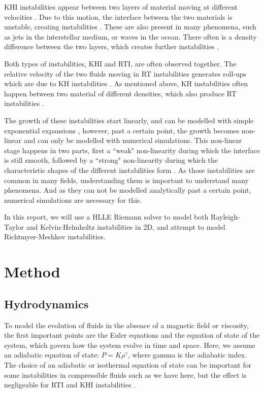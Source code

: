 \documentclass[a4paper,12pt]{article}
\begin{document}
KHI instabilities appear between two layers of material moving at different velocities \parencite{zhou_rayleightaylor_2021}. Due to this motion, the interface between the two materials is unstable, creating instabilities \parencite{matsumoto_onset_2004}. These are also present in many phenomena, such as jets in the interstellar medium, or waves in the ocean. There often is a density difference between the two layers, which creates further instabilities \parencite{matsumoto_onset_2004}.

Both types of instabilities, KHI and RTI, are often observed together. The relative velocity of the two fluids moving in RT instabilities generates roll-ups which are due to KH instabilities \parencite{zhou_rayleightaylor_2021}. As mentioned above, KH instabilities often happen between two material of different densities, which also produce RT instabilities \parencite{matsumoto_onset_2004}.\\
\linebreak

The growth of these instabilities start linearly, and can be modelled with simple exponential expansions \parencite{zhou_rayleightaylor_2021}, however, past a certain point, the growth becomes non-linear and can only be modelled with numerical simulations. This non-linear stage happens in two parts, first a ``weak" non-linearity during which the interface is still smooth, followed by a ``strong" non-linearity during which the characteristic shapes of the different instabilities form \parencite{zhou_rayleightaylor_2021,allen_rayleightaylor_1984}. As those instabilities are common in many fields, understanding them is important to understand many phenomena. And as they can not be modelled analytically past a certain point, numerical simulations are necessary for this.

In this report, we will use a HLLE Riemann solver to model both Rayleigh-Taylor and Kelvin-Helmholtz instabilities in 2D, and attempt to model Richtmyer-Meshkov instabilities. 


\section{Method}
\label{sec:meth}
\subsection{Hydrodynamics}
\label{subsec:hydrodyn}
To model the evolution of fluids in the absence of a magnetic field or viscosity, the first important points are the Euler equations and the equation of state of the system, which govern how the system evolve in time and space. Here, we assume an adiabatic equation of state: $P=K\rho^\gamma$, where gamma is the adiabatic index. The choice of an adiabatic or isothermal equation of state can be important for some instabilities in compressible fluids such as we have here, but the effect is negligeable for RTI and KHI instabilities \parencite{allen_rayleightaylor_1984}. 
\end{document}
